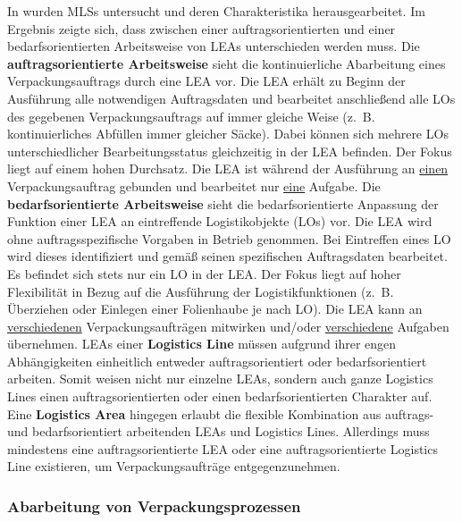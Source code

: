 In \cite{Blumenstein.Designprinzipien} wurden MLSs untersucht und deren Charakteristika herausgearbeitet. Im Ergebnis zeigte sich, dass zwischen einer auftragsorientierten und einer bedarfsorientierten Arbeitsweise von LEAs unterschieden werden muss. Die \textbf{auftragsorientierte Arbeitsweise} sieht die kontinuierliche Abarbeitung eines Verpackungsauftrags durch eine LEA vor. Die LEA erhält zu Beginn der Aus\-füh\-rung alle notwendigen Auftragsdaten und bearbeitet anschließend alle LOs des gegebenen Verpackungsauftrags auf immer gleiche Weise (z.~B. kontinuierliches Abfüllen immer gleicher Säcke). Dabei können sich mehrere LOs unterschiedlicher Bearbeitungsstatus gleichzeitig in der LEA befinden. Der Fokus liegt auf einem hohen Durchsatz. Die LEA ist während der Ausführung an \underline{einen} Verpackungsauftrag gebunden und bearbeitet nur \underline{eine} Aufgabe. Die \textbf{bedarfsorientierte Arbeitsweise} sieht die bedarfsorientierte Anpassung der Funktion einer LEA an eintreffende Logistikobjekte (LOs) vor. Die LEA wird ohne auftragsspezifische Vorgaben in Betrieb genommen. Bei Eintreffen eines LO wird dieses identifiziert und gemäß seinen spezifischen Auftragsdaten bearbeitet. Es befindet sich stets nur ein LO in der LEA. Der Fokus liegt auf hoher Flexibilität in Bezug auf die Ausführung der Logistikfunktionen (z.~B. Überziehen oder Einlegen einer Folienhaube je nach LO). Die LEA kann an \underline{verschiedenen} Verpackungsaufträgen mitwirken und/oder \underline{verschiedene} Aufgaben übernehmen. LEAs einer \textbf{Logistics Line} müssen aufgrund ihrer engen Abhängigkeiten einheitlich entweder auftragsorientiert oder bedarfsorientiert arbeiten. Somit weisen nicht nur einzelne LEAs, sondern auch ganze Logistics Lines einen auftragsorientierten oder einen bedarfsorientierten Charakter auf. Eine \textbf{Logistics Area} hingegen erlaubt die flexible Kombination aus auftrags- und bedarfsorientiert arbeitenden LEAs und Logistics Lines. Allerdings muss mindestens eine auftragsorientierte LEA oder eine auftragsorientierte Logistics Line existieren, um Verpackungsaufträge entgegenzunehmen. 

\subsubsection{Abarbeitung von Verpackungsprozessen}


